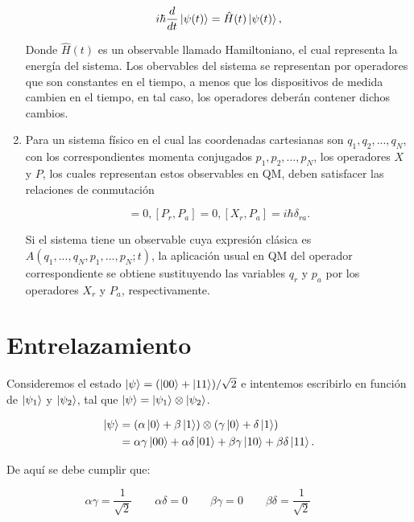 \begin{enumerate}
        \begin{equation}
            i \hbar \frac{d}{dt} \ket{\psi(t)} = \hat{H}(t) \ket{\psi(t)} ,
        \end{equation}

        Donde $\hat{H}(t)$ es un observable llamado Hamiltoniano, el cual representa la energía del sistema. Los obervables del sistema se representan por operadores que son constantes en el tiempo, a menos que los dispositivos de medida cambien en el tiempo, en tal caso, los operadores deberán contener dichos cambios.
    \item Para un sistema físico en el cual las coordenadas cartesianas son $q_1, q_2, ... , q_N$, con los correspondientes momenta conjugados $p_1, p_2, ... , p_N$, los operadores $X$ y $P$, los cuales representan estos observables en QM, deben satisfacer las relaciones de conmutación

        \begin{equation}
            [X_r, X_a] = 0, [P_r, P_a] = 0, [X_r, P_a] = i \hbar \delta_{ra} .
        \end{equation}

        Si el sistema tiene un observable cuya expresión clásica es $A(q_1, ... , q_N, p_1, ... , p_N; t)$, la aplicación usual en QM del operador correspondiente se obtiene sustituyendo las variables $q_r$ y $p_a$ por los operadores $X_r$ y $P_a$, respectivamente.
\end{enumerate}

\section{Entrelazamiento}

Consideremos el estado $\ket{\psi} = (\ket{00} + \ket{11})/\sqrt{2}$ e intentemos escribirlo en función de $\ket{\psi_1}$ y $\ket{\psi_2}$, tal que $\ket{\psi} = \ket{\psi_1} \otimes \ket{\psi_2}$.

\begin{align*}
    \ket{\psi}
    &= (\alpha \ket{0} + \beta \ket{1}) \otimes (\gamma \ket{0} + \delta \ket{1}) \\
    &= \alpha \gamma \ket{00} + \alpha \delta \ket{01} + \beta \gamma \ket{10} + \beta \delta \ket{11} .
\end{align*}

De aquí se debe cumplir que:

$$
    \alpha \gamma = \frac{1}{\sqrt{2}} \qquad
    \alpha \delta = 0 \qquad
    \beta \gamma = 0 \qquad
    \beta \delta = \frac{1}{\sqrt{2}} \qquad
$$

